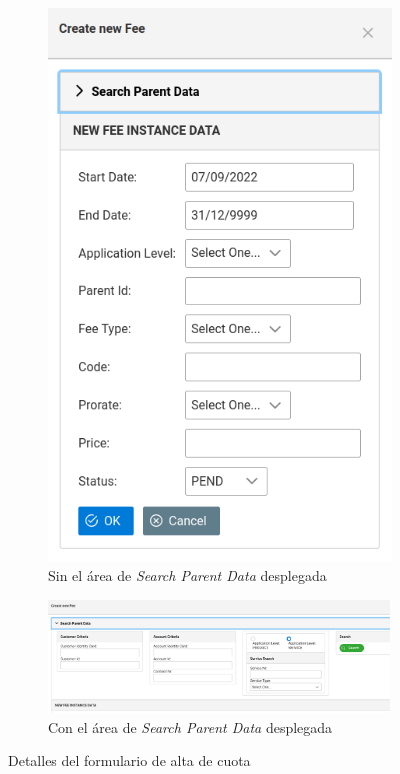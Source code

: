 \begin{description}
\begin{figure}
  \centering
  \begin{subfigure}[b]{0.3\textwidth}
    \includegraphics[width=\textwidth]{imaxes/formulario-alta-cuota-01.png}
    \caption{Sin el área de \emph{Search Parent Data} desplegada}
    \label{fig:formulario-alta-cuota-01}
  \end{subfigure}
  \begin{subfigure}[b]{0.69\textwidth}
    \includegraphics[width=\textwidth,height=3cm]{imaxes/formulario-alta-cuota-02.png}
    \caption{Con el área de \emph{Search Parent Data} desplegada}
    \label{fig:formulario-alta-cuota-02}
  \end{subfigure}
  \caption{Detalles del formulario de alta de cuota}
  \label{fig:alta-cuota}
\end{figure}



\end{description}
